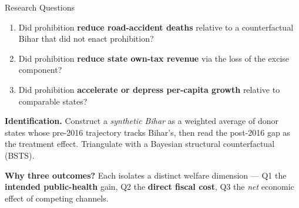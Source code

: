 \documentclass[aspectratio=169,11pt]{beamer}
\newcommand{\highlight}[1]{\textcolor{AmberDark}{\textbf{#1}}}
\newcommand{\navy}[1]{\textcolor{NavyPrimary}{\textbf{#1}}}
\newcommand{\greentext}[1]{\textcolor{SuccessGreen!80!black}{\textbf{#1}}}
\newcommand{\redtext}[1]{\textcolor{DangerRed}{\textbf{#1}}}
\newcommand{\toptight}{\vspace{-0.15cm}}
\begin{document}
\begin{frame}{Research Questions}
  \toptight
  \vspace{0.2cm}
  \begin{tcolorbox}[navybox,title={\faQuestion\enspace Three questions, one identification strategy}]
    \footnotesize
    \begin{enumerate}\setlength\itemsep{4pt}
      \item Did prohibition \highlight{reduce road-accident deaths}
            relative to a counterfactual Bihar that did not enact prohibition?
      \item Did prohibition \highlight{reduce state own-tax revenue} via the
            loss of the excise component?
      \item Did prohibition \highlight{accelerate or depress per-capita
            growth} relative to comparable states?
    \end{enumerate}
  \end{tcolorbox}

  \vspace{0.35cm}
  {\small\textbf{\navy{Identification.}}\;
  Construct a \emph{synthetic Bihar} as a weighted average of donor states
  whose pre-2016 trajectory tracks Bihar's, then read the post-2016 gap as
  the treatment effect. Triangulate with a Bayesian structural counterfactual
  (BSTS).}

  \vspace{0.30cm}
  \begin{tcolorbox}[greenbox]
    \scriptsize\textbf{Why three outcomes?} Each isolates a distinct welfare
    dimension --- Q1 the \greentext{intended public-health} gain,
    Q2 the \redtext{direct fiscal cost}, Q3 the \emph{net} economic effect
    of competing channels.
  \end{tcolorbox}
\end{frame}
\end{document}
